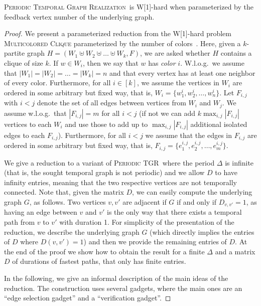 \documentclass[a4paper,UKenglish,cleveref, autoref, thm-restate]{lipics-v2021}
\newcommand{\deltaExactLong}{\textsc{Periodic Temporal Graph Realization}}
\newcommand{\deltaExact}{\textsc{Periodic TGR}}
\begin{document}
\begin{theorem}\label{thm:W1wrtFVS}
    \deltaExactLong\ is W[1]-hard when parameterized by the feedback vertex number of the underlying graph.
\end{theorem}
\begin{proof}
    We present a parameterized reduction from the W[1]-hard problem \textsc{Multicolored Clique} parameterized by the number of colors~\cite{fellows2009multipleinterval}.  Here, given a $k$-partite graph $H=(W_1\uplus W_2 \uplus\ldots\uplus W_k, F)$, we are asked whether $H$ contains a clique of size $k$. If $w\in W_i$, then we say that $w$ has \emph{color} $i$. W.l.o.g.\ we assume that $|W_1|=|W_2|=\ldots=|W_k|=n$ and that every vertex has at least one neighbor of every color. 
    Furthermore, for all $i\in[k]$, we assume the vertices in $W_i$ are ordered in some arbitrary but fixed way, that is, $W_i=\{w^i_1,w^i_2,\ldots,w^i_n\}$.
    Let $F_{i,j}$ with $i<j$ denote the set of all edges between vertices from $W_i$ and $W_j$. We assume w.l.o.g.\ that $|F_{i,j}|=m$ for all $i< j$  (if not we can add $k \max_{i,j}|F_{i,j}|$ vertices to each $W_i$ and use those to add up to $\max_{i,j}|F_{i,j}|$ additional isolated edges to each $F_{i,j}$).
    Furthermore, for all $i<j$ we assume that the edges in $F_{i,j}$ are ordered in some arbitrary but fixed way, that is, $F_{i,j}=\{e^{i,j}_1,e^{i,j}_2,\ldots,e^{i,j}_m\}$.

We give a reduction to a variant of \deltaExact\ where the period $\Delta$ is infinite (that is, the sought temporal graph is not periodic) and we allow $D$ to have infinity entries, meaning that the two respective vertices are not temporally connected. 
Note that, given the matrix $D$, we can easily compute the underlying graph $G$, as follows. Two vertices $v,v'$ are adjacent if $G$ if and only if $D_{v,v'}=1$, as having an edge between $v$ and $v'$ is the only way that there exists a temporal path from $v$ to $v'$ with duration 1. 
For simplicity of the presentation of the reduction, we describe the underlying graph $G$ (which directly implies the entries of $D$ where $D(v,v')=1$) and then we provide the remaining entries of $D$. 
At the end of the proof we show how to obtain the result for a finite $\Delta$ and a matrix $D$ of durations of fastest paths, that only has finite entries.



In the following, we give an informal description of the main ideas of the reduction. The construction uses several gadgets, where the main ones are an ``edge selection gadget'' and a ``verification gadget''.



\end{proof}
\end{document}
